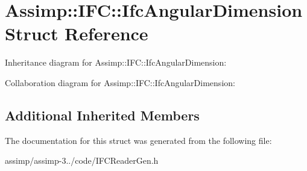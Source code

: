 \hypertarget{struct_assimp_1_1_i_f_c_1_1_ifc_angular_dimension}{\section{Assimp\+:\+:I\+F\+C\+:\+:Ifc\+Angular\+Dimension Struct Reference}
\label{struct_assimp_1_1_i_f_c_1_1_ifc_angular_dimension}
}


Inheritance diagram for Assimp\+:\+:I\+F\+C\+:\+:Ifc\+Angular\+Dimension\+:


Collaboration diagram for Assimp\+:\+:I\+F\+C\+:\+:Ifc\+Angular\+Dimension\+:
\subsection*{Additional Inherited Members}


The documentation for this struct was generated from the following file\+:\begin{DoxyCompactItemize}
\item 
assimp/assimp-\/3../code/I\+F\+C\+Reader\+Gen.\+h\end{DoxyCompactItemize}
